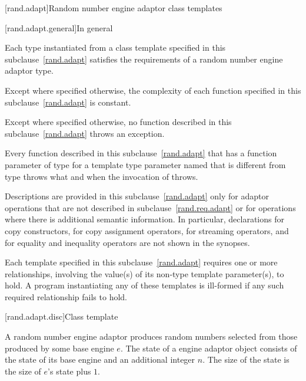 

[rand.adapt]{Random number engine adaptor class templates}

[rand.adapt.general]{In general}

\pnum
Each type instantiated
from a class template specified in this subclause~\ref{rand.adapt}
satisfies the requirements
of a random number engine adaptor type.

\pnum
Except where specified otherwise,
the complexity of each function
specified in this subclause~\ref{rand.adapt}
is constant.

\pnum
Except where specified otherwise,
no function described in this subclause~\ref{rand.adapt}
throws an exception.

\pnum
Every function described in this subclause~\ref{rand.adapt}
that has a function parameter  of type 
for a template type parameter named 
that is different from type 
throws what and when the invocation of  throws.

\pnum
Descriptions are provided in this subclause~\ref{rand.adapt}
only for adaptor operations
that are not described in subclause~\ref{rand.req.adapt}
or for operations where there is additional semantic information.
In particular,
declarations for copy constructors,
for copy assignment operators,
for streaming operators,
and for equality and inequality operators
are not shown in the synopses.

\pnum
Each template specified in this subclause~\ref{rand.adapt}
requires one or more relationships,
involving the value(s) of its non-type template parameter(s), to hold.
A program instantiating any of these templates
is ill-formed
if any such required relationship fails to hold.


[rand.adapt.disc]{Class template }%
%

\pnum
A  random number engine adaptor
produces random numbers
selected from those produced by some base engine $e$.
The state%
%
of a  engine adaptor object 
consists of the state  of its base engine 
and an additional integer $n$.
The size of the state is
 the size of $e$'s state plus $1$.

